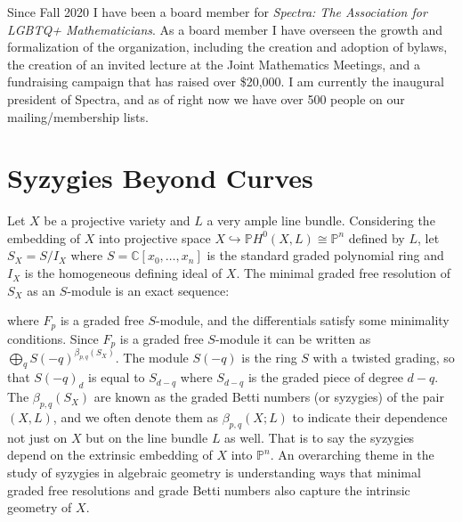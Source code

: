 \documentclass[11pt,reqno]{amsart}
\theoremstyle{remark}
\newcommand{\C}{\mathbb{C}}
\renewcommand{\P}{\mathbb{P}}
\begin{document}
Since Fall 2020 I have been a board member for \textit{Spectra: The Association for LGBTQ+ Mathematicians}. As a board member I have overseen the growth and formalization of the organization, including the creation and adoption of bylaws, the creation of an invited lecture at the Joint Mathematics Meetings, and a fundraising campaign that has raised over \$20,000. I am currently the inaugural president of Spectra, and as of right now we have over 500 people on our mailing/membership lists.  


\section{Syzygies Beyond Curves}\label{sec:syzygies-beyond}


Let $X$ be a projective variety and $L$ a very ample line bundle. Considering the embedding of $X$ into projective space $X \hookrightarrow \P H^{0}(X,L)\cong \P^{n}$ defined by $L$, let $S_{X}=S/I_{X}$ where $S=\C[x_{0},\ldots,x_{n}]$ is the standard graded polynomial ring and $I_{X}$ is the homogeneous defining ideal of $X$. The minimal graded free resolution of $S_{X}$ as an $S$-module is an exact sequence:
\begin{center}
\end{center}
where $F_{p}$ is a graded free $S$-module, and the differentials satisfy some minimality conditions. Since $F_{p}$ is a graded free $S$-module it can be written as $\bigoplus_{q}S(-q)^{\beta_{p,q}(S_{X})}$. The module $S(-q)$ is the ring $S$ with a twisted grading, so that $S(-q)_{d}$ is equal to $S_{d-q}$ where $S_{d-q}$ is the graded piece of degree $d-q$. The $\beta_{p,q}(S_{X})$ are known as the graded Betti numbers (or syzygies) of the pair $(X,L)$, and we often denote them as $\beta_{p,q}(X;L)$ to indicate their dependence not just on $X$ but on the line bundle $L$ as well. That is to say the syzygies depend on the extrinsic embedding of $X$ into $\P^{n}$. An overarching theme in the study of syzygies in algebraic geometry is understanding ways that minimal graded free resolutions and grade Betti numbers also capture the intrinsic geometry of $X$.   
\end{document}
